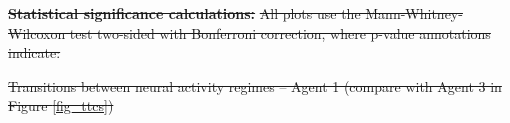 \documentclass[5p,twocolumn,authoryear]{elsarticle}
\providecommand{\DIFdeltex}[1]{{\protect\color{red}\sout{#1}}}                      %
\providecommand{\DIFdelbegin}{} %
\providecommand{\DIFdelend}{} %
\providecommand{\DIFdelFL}[1]{\DIFdel{#1}} %
\providecommand{\DIFdel}[1]{\texorpdfstring{\DIFdeltex{#1}}{}} %
\newcommand{\DIFscaledelfig}{0.5}
\newlength{\DIFdelgraphicswidth} %
\newlength{\DIFdelgraphicsheight} %
\newcommand{\DIFdelincludegraphics}[2][]{%
\sbox{\DIFdelgraphicsbox}{\DIFOincludegraphics[#1]{#2}}%
\settoboxwidth{\DIFdelgraphicswidth}{\DIFdelgraphicsbox} %
\settoboxtotalheight{\DIFdelgraphicsheight}{\DIFdelgraphicsbox} %
\scalebox{\DIFscaledelfig}{%
\parbox[b]{\DIFdelgraphicswidth}{\usebox{\DIFdelgraphicsbox}\\[-\baselineskip] \rule{\DIFdelgraphicswidth}{0em}}\llap{\resizebox{\DIFdelgraphicswidth}{\DIFdelgraphicsheight}{%
\setlength{\unitlength}{\DIFdelgraphicswidth}%
\begin{picture}(1,1)%
\thicklines\linethickness{2pt} %
{\color[rgb]{1,0,0}\put(0,0){\framebox(1,1){}}}%
{\color[rgb]{1,0,0}\put(0,0){\line( 1,1){1}}}%
{\color[rgb]{1,0,0}\put(0,1){\line(1,-1){1}}}%
\end{picture}%
}\hspace*{3pt}}} %
} %
\DeclareRobustCommand{\DIFdelbegin}{\DIFOdelbegin \let\includegraphics\DIFdelincludegraphics} %
\DeclareRobustCommand{\DIFdelend}{\DIFOaddend \let\includegraphics\DIFOincludegraphics} %
\begin{document}

\DIFdelbegin \textbf{\DIFdel{Statistical significance calculations:}}
\DIFdel{All plots use the Mann-Whitney-Wilcoxon test two-sided with Bonferroni correction, where p-value annotations indicate:  
}%
\DIFdelend %

\DIFdelbegin %
\DIFdelFL{Transitions between neural activity regimes -- Agent 1 (compare with Agent 3 in Figure \ref{fig_ttcs})
}%
\DIFdelend %
\end{document}
